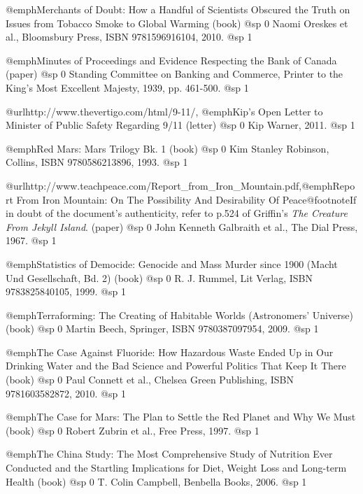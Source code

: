 \item
@emph{Merchants of Doubt: How a Handful of Scientists Obscured the Truth on Issues from Tobacco Smoke to Global Warming} (book)
@sp 0
Naomi Oreskes et al., Bloomsbury Press, ISBN 9781596916104, 2010.
@sp 1

\item
@emph{Minutes of Proceedings and Evidence Respecting the Bank of Canada} (paper)
@sp 0
Standing Committee on Banking and Commerce, Printer to the King's Most Excellent Majesty, 1939, pp. 461-500.
@sp 1

\item
@url{http://www.thevertigo.com/html/9-11/, @emph{Kip's Open Letter to Minister of Public Safety Regarding 9/11}} (letter)
@sp 0
Kip Warner, 2011.
@sp 1

\item
@emph{Red Mars: Mars Trilogy Bk. 1} (book)
@sp 0
Kim Stanley Robinson, Collins, ISBN 9780586213896, 1993.
@sp 1

\item
@url{http://www.teachpeace.com/Report_from_Iron_Mountain.pdf,@emph{Report From Iron Mountain: On The Possibility And Desirability Of Peace}}@footnote{If in doubt of the document's authenticity, refer to p.524 of Griffin's {\sl The Creature From Jekyll Island}.} (paper)
@sp 0
John Kenneth Galbraith et al., The Dial Press, 1967.
@sp 1

\item
@emph{Statistics of Democide: Genocide and Mass Murder since 1900 (Macht Und Gesellschaft, Bd. 2)} (book)
@sp 0
R. J. Rummel, Lit Verlag, ISBN 9783825840105, 1999.
@sp 1

\item
@emph{Terraforming: The Creating of Habitable Worlds (Astronomers' Universe)} (book)
@sp 0
Martin Beech, Springer, ISBN 9780387097954, 2009.
@sp 1

\item
@emph{The Case Against Fluoride: How Hazardous Waste Ended Up in Our Drinking Water and the Bad Science and Powerful Politics That Keep It There} (book)
@sp 0
Paul Connett et al., Chelsea Green Publishing, ISBN 9781603582872, 2010.
@sp 1

\item
@emph{The Case for Mars: The Plan to Settle the Red Planet and Why We Must} (book)
@sp 0
Robert Zubrin et al., Free Press, 1997.
@sp 1

\item
@emph{The China Study: The Most Comprehensive Study of Nutrition Ever Conducted and the Startling Implications for Diet, Weight Loss and Long-term Health} (book)
@sp 0
T. Colin Campbell, Benbella Books, 2006.
@sp 1

